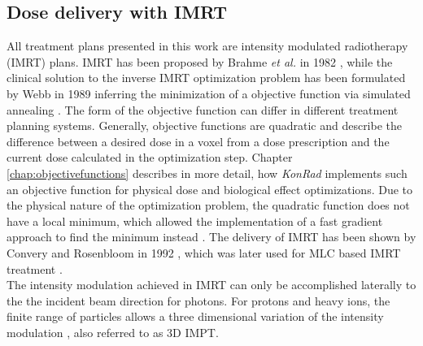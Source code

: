 \subsection{Dose delivery with IMRT}
All treatment plans presented in this work are intensity modulated radiotherapy (IMRT) plans. IMRT has been proposed by Brahme \textit{et al.} in 1982 \cite{pmid7146095}, while the clinical solution to the inverse IMRT optimization problem has been formulated by Webb in 1989 \cite{pmid2682694} inferring the minimization of a objective function via simulated annealing \cite{pmid16790913}. The form of the objective function can differ in different treatment planning systems. Generally, objective functions are quadratic and describe the difference between a desired dose in a voxel from a dose prescription and the current dose calculated in the optimization step. Chapter \ref{chap:objectivefunctions} describes in more detail, how \textit{KonRad} implements such an objective function for physical dose and biological effect optimizations. Due to the physical nature of the optimization problem, the quadratic function does not have a local minimum, which allowed the implementation of a fast gradient approach to find the minimum instead \cite{pmid2243845}. The delivery of IMRT has been shown by Convery and Rosenbloom in 1992 \cite{Convery_Rosebloom_1992}, which was later used for MLC based IMRT treatment \cite{pmid8690638}. \\The intensity modulation achieved in IMRT can only be accomplished laterally to the the incident beam direction for photons. For protons and heavy ions, the finite range of particles allows a three dimensional variation of the intensity modulation \cite{pmid10071883}, also referred to as 3D IMPT.
